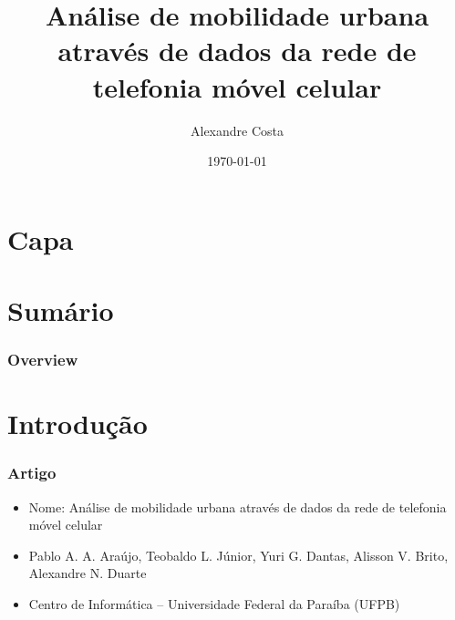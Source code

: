 \documentclass{beamer}
\title[SSCAU]{Análise de mobilidade urbana através de dados da rede de telefonia móvel celular} %
\author{Alexandre Costa} %
\institute[UFPEL] %
{
Universidade Federal de Pelotas \\ %
\medskip
\textit{alexandre.gcosta@gmail.com} %
}
\date{\today} %
\begin{document}
\section{Capa}

\begin{frame}
\titlepage %
\end{frame}

\section{Sumário}

\begin{frame}
\frametitle{Overview} %
\tableofcontents %
\end{frame}


\section{Introdução} %

\begin{frame}
	\frametitle{Artigo}
	\begin{itemize}
		\item Nome: Análise de mobilidade urbana através de dados da rede de telefonia móvel celular
		\item Pablo A. A. Araújo, Teobaldo L. Júnior, Yuri G. Dantas, Alisson V. Brito, Alexandre N. Duarte
		\item Centro de Informática – Universidade Federal da Paraíba (UFPB)
	\end{itemize}
\end{frame}
\end{document}
